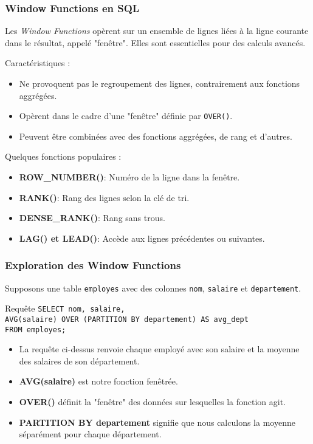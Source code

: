 \begin{frame}
  \frametitle{Window Functions en SQL}

  Les \textit{Window Functions} opèrent sur un ensemble de lignes liées à la ligne courante dans le résultat, appelé "fenêtre". Elles sont essentielles pour des calculs avancés.

  Caractéristiques :
  \begin{itemize}
    \item Ne provoquent pas le regroupement des lignes, contrairement aux fonctions aggrégées.
    \item Opèrent dans le cadre d'une "fenêtre" définie par \texttt{OVER()}.
    \item Peuvent être combinées avec des fonctions aggrégées, de rang et d'autres.
  \end{itemize}

  Quelques fonctions populaires :
  \begin{itemize}
    \item \textbf{ROW\_NUMBER()}: Numéro de la ligne dans la fenêtre.
    \item \textbf{RANK()}: Rang des lignes selon la clé de tri.
    \item \textbf{DENSE\_RANK()}: Rang sans trous.
    \item \textbf{LAG() et LEAD()}: Accède aux lignes précédentes ou suivantes.
  \end{itemize}

\end{frame}

\begin{frame}
  \frametitle{Exploration des Window Functions}

  Supposons une table \texttt{employes} avec des colonnes \texttt{nom}, \texttt{salaire} et \texttt{departement}.

  \begin{block}{Requête}
    \texttt{SELECT nom, salaire, \\
    AVG(salaire) OVER (PARTITION BY departement) AS avg\_dept \\
    FROM employes;}
  \end{block}

  \begin{itemize}
    \item La requête ci-dessus renvoie chaque employé avec son salaire et la moyenne des salaires de son département.
    \item \textbf{AVG(salaire)} est notre fonction fenêtrée.
    \item \textbf{OVER()} définit la "fenêtre" des données sur lesquelles la fonction agit.
    \item \textbf{PARTITION BY departement} signifie que nous calculons la moyenne séparément pour chaque département.
  \end{itemize}

\end{frame}



